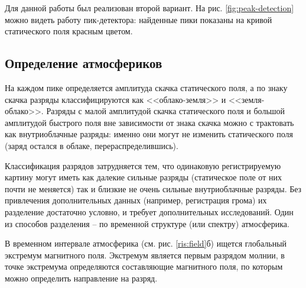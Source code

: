 \documentclass[a4paper,14pt]{extarticle}
\begin{document}
Для данной работы был реализован второй вариант. На рис. \ref{fig:peak-detection} можно видеть работу пик-детектора: найденные пики показаны на кривой статического поля красным цветом.


\subsection{Определение атмосфериков}

На каждом пике определяется амплитуда скачка статического поля, а по знаку скачка разряды классифицируются как <<облако-земля>> и <<земля-облако>>. Разряды с малой амплитудой скачка статического поля и большой амплитудой быстрого поля вне зависимости от знака скачка можно с трактовать как внутриоблачные разряды: именно они могут не изменить статического поля (заряд остался в облаке, перераспределившись).

Классификация разрядов затрудняется тем, что одинаковую регистрируемую картину могут иметь как далекие сильные разряды (статическое поле от них почти не меняется) так и близкие не очень сильные внутриоблачные разряды.
Без привлечения дополнительных данных (например, регистрация грома) их разделение достаточно условно, и требует дополнительных исследований. Один из способов разделения -- по временной структуре (или спектру) атмосферика.

В временном интервале атмосферика (см. рис. \ref{ris:field}б) ищется глобальный экстремум магнитного поля. Экстремум является первым разрядом молнии, в точке экстремума определяются составляющие магнитного поля, по которым можно определить направление на разряд.
\end{document}
